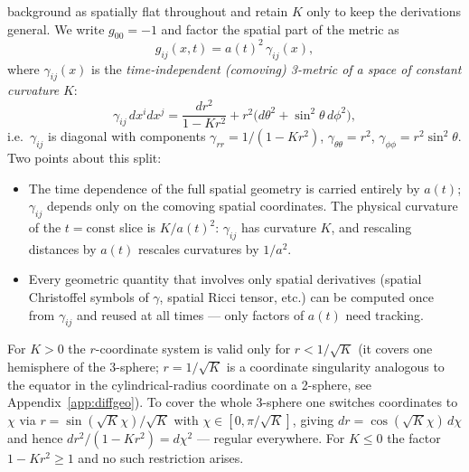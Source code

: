 \documentclass[12pt]{article}
\begin{document}
background as spatially flat throughout and retain $K$ only to keep
the derivations general.  We write $g_{00}=-1$ and factor the spatial part of the metric as
%
\begin{equation}
  g_{ij}(x,t) = a(t)^2\,\gamma_{ij}(x),
\end{equation}
%
where $\gamma_{ij}(x)$ is the \emph{time-independent (comoving)
3-metric of a space of constant curvature} $K$:
%
\begin{equation}
  \gamma_{ij}\,dx^i dx^j
  = \frac{dr^2}{1-Kr^2} + r^2\bigl(d\theta^2 + \sin^2\!\theta\,d\phi^2\bigr),
  \label{eq:gamma_metric}
\end{equation}
%
i.e.\ $\gamma_{ij}$ is diagonal with components
$\gamma_{rr}=1/(1-Kr^2)$, $\gamma_{\theta\theta}=r^2$,
$\gamma_{\phi\phi}=r^2\sin^2\!\theta$.  Two points about this split:
\begin{itemize}
  \item The time dependence of the full spatial geometry is carried
    entirely by $a(t)$; $\gamma_{ij}$ depends only on the comoving
    spatial coordinates.  The physical curvature of the $t=\mathrm{const}$
    slice is $K/a(t)^2$: $\gamma_{ij}$ has curvature $K$, and
    rescaling distances by $a(t)$ rescales curvatures by $1/a^2$.
  \item Every geometric quantity that involves only spatial
    derivatives (spatial Christoffel symbols of $\gamma$, spatial
    Ricci tensor, etc.) can be computed once from $\gamma_{ij}$ and
    reused at all times --- only factors of $a(t)$ need tracking.
\end{itemize}
%
For $K>0$ the $r$-coordinate system is valid only for $r<1/\sqrt{K}$
(it covers one hemisphere of the 3-sphere; $r=1/\sqrt{K}$ is a
coordinate singularity analogous to the equator in the
cylindrical-radius coordinate on a 2-sphere, see
Appendix~\ref{app:diffgeo}).  To cover the whole 3-sphere one switches coordinates
to $\chi$ via $r = \sin(\sqrt{K}\chi)/\sqrt{K}$ with
$\chi\in[0,\pi/\sqrt{K}]$, giving $dr = \cos(\sqrt{K}\chi)\,d\chi$
and hence $dr^2/(1-Kr^2) = d\chi^2$ --- regular everywhere.  For $K\le 0$ the
factor $1-Kr^2\ge 1$ and no such restriction arises.
\end{document}
